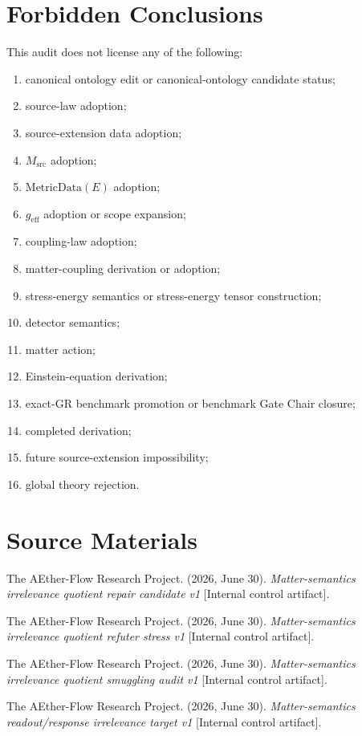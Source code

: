 \section{Forbidden Conclusions}

This audit does not license any of the following:
\begin{enumerate}
  \item canonical ontology edit or canonical-ontology candidate status;
  \item source-law adoption;
  \item source-extension data adoption;
  \item \(M_{\mathrm{src}}\) adoption;
  \item \(\mathrm{MetricData}(E)\) adoption;
  \item \(g_{\mathrm{eff}}\) adoption or scope expansion;
  \item coupling-law adoption;
  \item matter-coupling derivation or adoption;
  \item stress-energy semantics or stress-energy tensor construction;
  \item detector semantics;
  \item matter action;
  \item Einstein-equation derivation;
  \item exact-GR benchmark promotion or benchmark Gate Chair closure;
  \item completed derivation;
  \item future source-extension impossibility;
  \item global theory rejection.
\end{enumerate}

\section{Source Materials}

The AEther-Flow Research Project. (2026, June 30). \emph{Matter-semantics
irrelevance quotient repair candidate v1} [Internal control artifact].

The AEther-Flow Research Project. (2026, June 30). \emph{Matter-semantics
irrelevance quotient refuter stress v1} [Internal control artifact].

The AEther-Flow Research Project. (2026, June 30). \emph{Matter-semantics
irrelevance quotient smuggling audit v1} [Internal control artifact].

The AEther-Flow Research Project. (2026, June 30). \emph{Matter-semantics
readout/response irrelevance target v1} [Internal control artifact].
